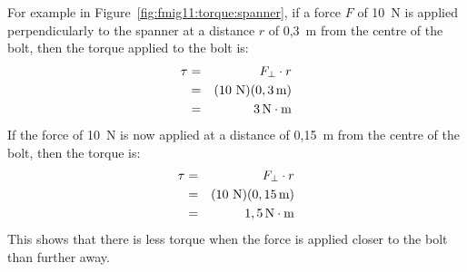 For example in Figure~\ref{fig:fmig11:torque:spanner}, if a force $F$ of 10~N is applied perpendicularly to the spanner at a distance $r$ of 0,3~m from the centre of the bolt, then the torque applied to the bolt is:
\begin{eqnarray*}
\tau&=&F_{\perp} \cdot r\\
&=&(10\,\,\rm{N})(0,3\,\rm{m})\\
&=&3\,\mathrm{N\cdot m}
\end{eqnarray*}
If the force of 10~N is now applied at a distance of 0,15~m from the centre of the bolt, then the torque is:
\begin{eqnarray*}
\tau&=&F_{\perp} \cdot r\\
&=&(10\,\,\rm{N})(0,15\,\rm{m})\\
&=&1,5\,\mathrm{N\cdot m}
\end{eqnarray*}
This shows that there is less torque when the force is applied closer to the bolt than further away.






